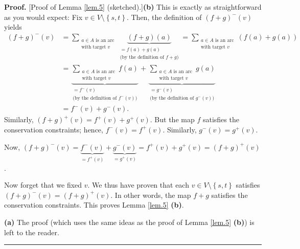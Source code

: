 \documentclass[numbers=enddot,12pt,final,onecolumn,notitlepage]{scrartcl}%
\theoremstyle{definition}
\newenvironment{proof}[1][Proof]{\noindent\textbf{#1.} }{\ \rule{0.5em}{0.5em}}
\let\sumnonlimits\sum
\renewcommand{\sum}{\sumnonlimits\limits}
\begin{document}
\begin{proof}
[Proof of Lemma \ref{lem.5} (sketched).]\textbf{(b)} This is exactly as
straightforward as you would expect: Fix $v\in V\setminus\left\{  s,t\right\}
$. Then, the definition of $\left(  f+g\right)  ^{-}\left(  v\right)  $ yields%
\begin{align*}
\left(  f+g\right)  ^{-}\left(  v\right)   &  =\sum_{\substack{a\in A\text{ is
an arc}\\\text{with target }v}}\underbrace{\left(  f+g\right)  \left(
a\right)  }_{\substack{=f\left(  a\right)  +g\left(  a\right)  \\\text{(by the
definition of }f+g\text{)}}}=\sum_{\substack{a\in A\text{ is an arc}%
\\\text{with target }v}}\left(  f\left(  a\right)  +g\left(  a\right)  \right)
\\
&  =\underbrace{\sum_{\substack{a\in A\text{ is an arc}\\\text{with target }%
v}}f\left(  a\right)  }_{\substack{=f^{-}\left(  v\right)  \\\text{(by the
definition of }f^{-}\left(  v\right)  \text{)}}}+\underbrace{\sum
_{\substack{a\in A\text{ is an arc}\\\text{with target }v}}g\left(  a\right)
}_{\substack{=g^{-}\left(  v\right)  \\\text{(by the definition of }%
g^{-}\left(  v\right)  \text{)}}}\\
&  =f^{-}\left(  v\right)  +g^{-}\left(  v\right)  .
\end{align*}
Similarly, $\left(  f+g\right)  ^{+}\left(  v\right)  =f^{+}\left(  v\right)
+g^{+}\left(  v\right)  $. But the map $f$ satisfies the conservation
constraints; hence, $f^{-}\left(  v\right)  =f^{+}\left(  v\right)  $.
Similarly, $g^{-}\left(  v\right)  =g^{+}\left(  v\right)  $.

Now, $\left(  f+g\right)  ^{-}\left(  v\right)  =\underbrace{f^{-}\left(
v\right)  }_{=f^{+}\left(  v\right)  }+\underbrace{g^{-}\left(  v\right)
}_{=g^{+}\left(  v\right)  }=f^{+}\left(  v\right)  +g^{+}\left(  v\right)
=\left(  f+g\right)  ^{+}\left(  v\right)  $.

Now forget that we fixed $v$. We thus have proven that each $v\in
V\setminus\left\{  s,t\right\}  $ satisfies $\left(  f+g\right)  ^{-}\left(
v\right)  =\left(  f+g\right)  ^{+}\left(  v\right)  $. In other words, the
map $f+g$ satisfies the conservation constraints. This proves Lemma
\ref{lem.5} \textbf{(b)}.

\textbf{(a)} The proof (which uses the same ideas as the proof of Lemma
\ref{lem.5} \textbf{(b)}) is left to the reader.
\end{proof}
\end{document}
